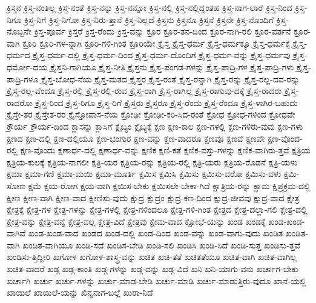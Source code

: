 {ಕ್ರಿಸ್ತನ
ಕ್ರಿಸ್ತ-ನಂತಿಲ್ಲ
ಕ್ರಿಸ್ತ-ನಂತೆ
ಕ್ರಿಸ್ತ-ನನ್ನು
ಕ್ರಿಸ್ತ-ನನ್ನೋ
ಕ್ರಿಸ್ತ-ನಲ್ಲಿ
ಕ್ರಿಸ್ತ-ನಲ್ಲಿದ್ದಂತಹ
ಕ್ರಿಸ್ತ-ನಾಗ-ಲಾರೆ
ಕ್ರಿಸ್ತ-ನಿಂದ
ಕ್ರಿಸ್ತ-ನಿಗೂ
ಕ್ರಿಸ್ತ-ನಿಗೆ
ಕ್ರಿಸ್ತ-ನಿಗೋ
ಕ್ರಿಸ್ತ-ನಿರು-ತ್ತಾನೆ
ಕ್ರಿಸ್ತ-ನಿಲ್ಲದೆ
ಕ್ರಿಸ್ತನು
ಕ್ರಿಸ್ತನೂ
ಕ್ರಿಸ್ತನೆ
ಕ್ರಿಸ್ತನೇ
ಕ್ರಿಸ್ತ-ನೊಂದಿಗೆ
ಕ್ರಿಸ್ತ-ನೊಬ್ಬನೇ
ಕ್ರಿಸ್ತ-ಪೂರ್ವ
ಕ್ರಿಸ್ತರೆ
ಕ್ರಿಸ್ತ-ರೆಂದು
ಕ್ರಿಸ್ತ-ವನ್ನು
ಕ್ರೂರ
ಕ್ರೂರ-ತನ-ದಿಂದ
ಕ್ರೂರ-ನಾಗಿ-ರಲಿ
ಕ್ರೂರ-ವರ್ತನೆ
ಕ್ರೂರ-ವಾಗಿ
ಕ್ರೂರಿ
ಕ್ರೂರಿ-ಗಳ-ನ್ನಾಗಿ
ಕ್ರೂರಿ-ಗಳಿ-ಗಿಂತ
ಕ್ರೂರಿಯೇ
ಕ್ರೈಸ್ತ
ಕ್ರೈಸ್ತ-ಧರ್ಮ
ಕ್ರೈಸ್ತ-ಧರ್ಮಕ್ಕೂ
ಕ್ರೈಸ್ತ-ಧರ್ಮಕ್ಕೆ
ಕ್ರೈಸ್ತ-ಧರ್ಮದ
ಕ್ರೈಸ್ತ-ಧರ್ಮ-ದಲ್ಲಿ
ಕ್ರೈಸ್ತ-ಧರ್ಮ-ದಿಂದ
ಕ್ರೈಸ್ತ-ಧರ್ಮ-ದೊಂದಿಗೆ
ಕ್ರೈಸ್ತ-ಧರ್ಮ-ವನ್ನು
ಕ್ರೈಸ್ತ-ಧರ್ಮವು
ಕ್ರೈಸ್ತ-ಧರ್ಮೋ-ದಯ
ಕ್ರೈಸ್ತನಿ-ಗಾಗಿಯೂ
ಕ್ರೈಸ್ತ-ನೀತಿ
ಕ್ರೈಸ್ತನು
ಕ್ರೈಸ್ತ-ಪಂಗಡ-ಗಳನ್ನು
ಕ್ರೈಸ್ತ-ಪಾದ್ರಿ-ಗಳ
ಕ್ರೈಸ್ತ-ಪಾದ್ರಿ-ಗಳು
ಕ್ರೈಸ್ತ-ಪಾದ್ರಿ-ಗಳೂ
ಕ್ರೈಸ್ತ-ಬೋಧ-ನೆಯ
ಕ್ರೈಸ್ತ-ಮತದ
ಕ್ರೈಸ್ತರ
ಕ್ರೈಸ್ತ-ರಂತೆ
ಕ್ರೈಸ್ತ-ರನ್ನಾಗಿ
ಕ್ರೈಸ್ತ-ರನ್ನು
ಕ್ರೈಸ್ತ-ರಲ್ಲ-ದವ-ರನ್ನು
ಕ್ರೈಸ್ತ-ರಲ್ಲ-ವೆಂದೂ
ಕ್ರೈಸ್ತ-ರಲ್ಲಿ
ಕ್ರೈಸ್ತ-ರಲ್ಲಿ-ರುವ
ಕ್ರೈಸ್ತ-ರಾಗಿ
ಕ್ರೈಸ್ತ-ರಾಗಿಲ್ಲ
ಕ್ರೈಸ್ತ-ರಾಗುವು-ದಕ್ಕೆ
ಕ್ರೈಸ್ತ-ರಾದರು
ಕ್ರೈಸ್ತ-ರಾದರೋ
ಕ್ರೈಸ್ತ-ರಿಂದ
ಕ್ರೈಸ್ತ-ರಿಗೂ
ಕ್ರೈಸ್ತ-ರಿಗೆ
ಕ್ರೈಸ್ತರು
ಕ್ರೈಸ್ತರೂ
ಕ್ರೈಸ್ತ-ರೆಂದು
ಕ್ರೈಸ್ತ-ರೆಂದೂ
ಕ್ರೈಸ್ತ-ಳಾಗಿರ-ಬಹುದು
ಕ್ರೈಸ್ತೇ-ತರ
ಕ್ರೈಸ್ತೇತ-ರರ
ಕ್ರೈಸ್ತೋಪಾಸ-ನೆಯ
ಕ್ರೋಢೀ
ಕ್ರೋಢೀ-ಕರಿ-ಸಿದ-ರಂತೆ
ಕ್ರೋಧ
ಕ್ರೋಧ-ಗಳಿಂದ
ಕ್ರೋಧವೇ
ಕ್ರೌರ್ಯ
ಕ್ರೌರ್ಯ-ದಿಂದ
ಕ್ಲಾಸನ್ನು
ಕ್ಲಾಸಿಗೆ
ಕ್ಲೈಬ್ಯಂ
ಕ್ಲೈಬ್ಯಕ್ಕೆ
ಕ್ಷಣ
ಕ್ಷಣ-ಕಾಲ
ಕ್ಷಣ-ಗಳಲ್ಲಿ
ಕ್ಷಣ-ಗಳಿರು-ವುವು
ಕ್ಷಣ-ಗಳು
ಕ್ಷಣದ
ಕ್ಷಣ-ದಲ್ಲಿ
ಕ್ಷಣ-ದಲ್ಲಿಯೂ
ಕ್ಷಣ-ಭಂಗುರ
ಕ್ಷಣ-ವನ್ನು
ಕ್ಷಣ-ವಾದರೂ
ಕ್ಷಣವೂ
ಕ್ಷಣವೆ
ಕ್ಷಣವೇ
ಕ್ಷಣ-ವೊಂದ-ರಲ್ಲಿ
ಕ್ಷಣ-ವೊಂದು
ಕ್ಷಣಾರ್ಧ-ದಲ್ಲಿ
ಕ್ಷಣಾರ್ಧ-ವನ್ನು
ಕ್ಷಣಿಕ
ಕ್ಷಣಿ-ಕತೆ
ಕ್ಷಣಿಕ-ವಸ್ತು-ಗಳನ್ನು
ಕ್ಷಣಿಕ-ವಾಗಿರು-ತ್ತವೆ
ಕ್ಷತ್ರಿಯ
ಕ್ಷತ್ರಿಯ-ಕುಲಕ್ಕೆ
ಕ್ಷತ್ರಿಯ-ನಾಗಲೀ
ಕ್ಷತ್ರಿ-ಯರ
ಕ್ಷತ್ರಿಯ-ರನ್ನು
ಕ್ಷತ್ರಿಯ-ರಲ್ಲಿ
ಕ್ಷತ್ರಿ-ಯರು
ಕ್ಷತ್ರಿಯ-ರೊಡನೆ
ಕ್ಷತ್ರಿ-ಯಳು
ಕ್ಷಮಾ
ಕ್ಷಮಾ-ಗಣಿ
ಕ್ಷಮಾ-ಮಯಿ
ಕ್ಷಮಾ-ಮೂರ್ತಿ
ಕ್ಷಮಿಸ
ಕ್ಷಮಿಸಿ
ಕ್ಷಮಿಸು
ಕ್ಷಮಿಸು-ವರೋ
ಕ್ಷಮಿಸು-ವಳು
ಕ್ಷಮಿ-ಸೋಣ
ಕ್ಷಮೆ
ಕ್ಷಯ-ರೋಗ
ಕ್ಷಯ-ವಾಗಿ
ಕ್ಷಯಿಸ-ಬೇಕು
ಕ್ಷಯಿಸಲೇ-ಬೇಕಾ-ಗಿದೆ
ಕ್ಷಾತ್ರಿಯ-ರನ್ನು
ಕ್ಷಾಮ
ಕ್ಷಿಪ್ರಕ್ರಮ-ದಲ್ಲಿ
ಕ್ಷೀಣ
ಕ್ಷೀಣ-ವಾಗಿ
ಕ್ಷೀಣ-ವಾದ
ಕ್ಷೀಣಿಸು-ವುದು
ಕ್ಷುದ್ರ
ಕ್ಷುದ್ರಂ
ಕ್ಷುದ್ರ-ಕಣ-ದಿಂದ
ಕ್ಷುದ್ರ-ಜೀವವು
ಕ್ಷುದ್ರ-ವಾದ
ಕ್ಷೇತ್ರ
ಕ್ಷೇತ್ರಕ್ಕೆ
ಕ್ಷೇತ್ರ-ಗಳ
ಕ್ಷೇತ್ರ-ಗಳನ್ನು
ಕ್ಷೇತ್ರ-ಗಳಲ್ಲಿ
ಕ್ಷೇತ್ರ-ಗಳಿಂದಲೂ
ಕ್ಷೇತ್ರ-ಗಳಿ-ಗಿಂತ
ಕ್ಷೇತ್ರದ
ಕ್ಷೇತ್ರ-ದಲ್ಲಾ-ಗಲಿ
ಕ್ಷೇತ್ರ-ದಲ್ಲಿ
ಕ್ಷೇತ್ರ-ವನ್ನು
ಕ್ಷೇತ್ರ-ವನ್ನೆ
ಕ್ಷೇತ್ರ-ವಲ್ಲ
ಕ್ಷೇತ್ರ-ವಿದೆ
ಕ್ಷೇತ್ರವು
ಕ್ಷೇಮ-ವಾದ
ಕ್ಷೋಭೆ-ಯನ್ನು
ಖಂಡ
ಖಂಡಕ್ಕೆ
ಖಂಡ-ಖಂಡ-ವಾಗಿವೆ
ಖಂಡ-ಖಂಡ-ವಾದ
ಖಂಡದ
ಖಂಡ-ದಲ್ಲಿ
ಖಂಡ-ದಿಂದ
ಖಂಡ-ವನ್ನು
ಖಂಡ-ವಾಗು-ವುದು
ಖಂಡಿತ
ಖಂಡಿತ-ವಾಗಿ
ಖಂಡಿತ-ವಾಗಿಯೂ
ಖಂಡಿ-ಸದೆ
ಖಂಡಿಸ-ಬೇಡಿ
ಖಂಡಿ-ಸಲಿ
ಖಂಡಿಸಿ
ಖಂಡಿ-ಸಿದೆ
ಖಂಡಿ-ಸುತ್ತ
ಖಂಡಿಸು-ತ್ತವೆ
ಖಂಡಿಸು-ತ್ತಿದ್ದೀರಿ
ಖಗೋಳ
ಖಗೋಳ-ಶಾಸ್ತ್ರ-ವನ್ನು
ಖಚಿತ
ಖಚಿ-ತತೆ
ಖಚಿತತೆಯೂ
ಖಚಿತ-ವಾಗಿ
ಖಚಿತ-ವಾಗಿಲ್ಲ
ಖಚಿತ-ವಾದರೆ
ಖಡ್ಗ
ಖಡ್ಗ-ಕಾಂತಿ
ಖಡ್ಗ-ಗಳನ್ನು
ಖಡ್ಗ-ವನ್ನು
ಖಡ್ಗ-ವಿದೆ
ಖನಿ
ಖನಿ-ಯಾಗು-ವನು
ಖರ್ಚಾಗ-ಬೇಕು
ಖರ್ಚಾಗಿ
ಖರ್ಚು
ಖರ್ಚು-ಗಳನ್ನು
ಖರ್ಚು-ಮಾಡ-ಬೇಡಿ
ಖರ್ಚು-ಮಾಡಿ
ಖರ್ಚು-ಮಾಡುತ್ತಿರು-ವುದೂ
ಖಾನೆ-ಯಲ್ಲಿ
ಖಾಯಿಲೆ
ಖಾಯಿಲೆ-ಯನ್ನು
ಖಿನ್ನನಾಗ-ಬಲ್ಲೆ
ಖುರಾ-ನಿದೆ
}
